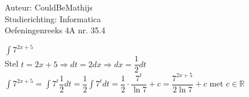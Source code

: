 \documentclass[a4paper]{article}
\newcommand{\intt}{\displaystyle\int}
\begin{document}
  
\noindent \large Auteur: CouldBeMathijs \\
\noindent \large Studierichting: Informatica\\
\noindent \large Oefeningenreeks 4A nr. 35.4\\

\medskip

\normalsize

$\intt7^{2x+5}$\\

Stel $t = 2x+5 \Rightarrow dt = 2dx \Rightarrow dx = \dfrac{1}{2} dt$\\

$\intt7^{2x+5} = \intt 7^t \dfrac{1}{2} dt = \dfrac{1}{2} \intt  7^t dt = \dfrac{1}{2} \cdot \dfrac{7^t}{\ln 7} + c = \dfrac{7^{2x+5}}{2\ln 7} + c$ met $c \in \mathbb{R}$

\begin{thebibliography}{999}
\end{thebibliography}
\end{document}

